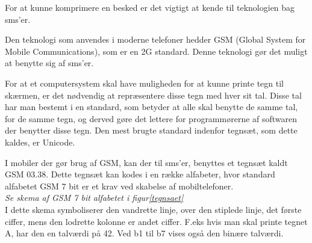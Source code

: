 For at kunne komprimere en besked er det vigtigt at kende til teknologien bag sms'er.

Den teknologi som anvendes i moderne telefoner hedder GSM (Global System for Mobile Communications), som er en 2G standard. Denne teknologi gør det muligt at benytte sig af sms'er.\cite{GSM_term}

For at et computersystem skal have muligheden for at kunne printe tegn til skærmen, er det nødvendig at repræsentere disse tegn med hver sit tal. Disse tal har man bestemt i en standard, som betyder at alle skal benytte de samme tal, for de samme tegn, og derved gøre det lettere for programmørerne af softwaren der benytter disse tegn. Den mest brugte standard indenfor tegnsæt, som dette kaldes, er Unicode.\cite{UNICODE_standard}

I mobiler der gør brug af GSM, kan der til sms'er, benyttes et tegnsæt kaldt GSM 03.38. Dette tegnsæt kan kodes i en række alfabeter, hvor standard alfabetet GSM 7 bit er et krav ved skabelse af mobiltelefoner.\cite{GSM_7_bit}
\\
\emph {Se skema af GSM 7 bit alfabetet i figur\ref{tegnsaet}}
\\
I dette skema symboliserer den vandrette linje, over den stiplede linje, det første ciffer, mens den lodrette kolonne er andet ciffer. F.eks hvis man skal printe tegnet A, har den en talværdi på 42. Ved b1 til b7 vises også den binære talværdi.
